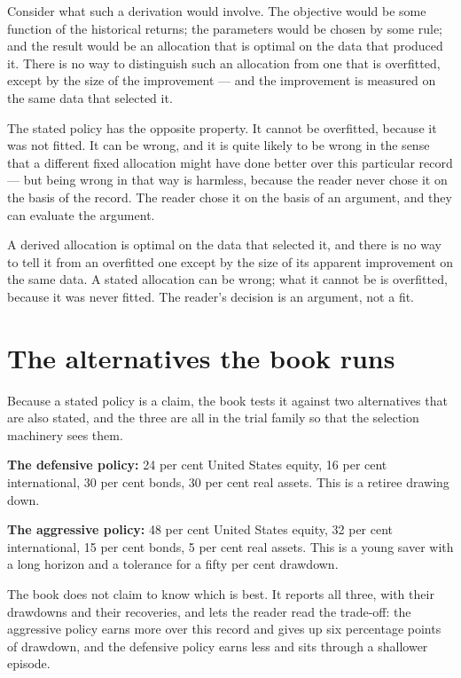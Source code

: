 Consider what such a derivation would involve. The objective would be
some function of the historical returns; the parameters would be chosen
by some rule; and the result would be an allocation that is optimal on
the data that produced it. There is no way to distinguish such an
allocation from one that is overfitted, except by the size of the
improvement --- and the improvement is measured on the same data that
selected it.

The stated policy has the opposite property. It cannot be overfitted,
because it was not fitted. It can be wrong, and it is quite likely to be
wrong in the sense that a different fixed allocation might have done
better over this particular record --- but being wrong in that way is
harmless, because the reader never chose it on the basis of the record.
The reader chose it on the basis of an argument, and they can evaluate the
argument.

\begin{takeaway}
A derived allocation is optimal on the data that selected it, and there is
no way to tell it from an overfitted one except by the size of its
apparent improvement on the same data. A stated allocation can be wrong;
what it cannot be is overfitted, because it was never fitted. The reader's
decision is an argument, not a fit.
\end{takeaway}

\section{The alternatives the book runs}

Because a stated policy is a claim, the book tests it against two
alternatives that are also stated, and the three are all in the trial
family so that the selection machinery sees them.

\textbf{The defensive policy:} 24 per cent United States equity, 16 per
cent international, 30 per cent bonds, 30 per cent real assets. This is a
retiree drawing down.

\textbf{The aggressive policy:} 48 per cent United States equity, 32 per
cent international, 15 per cent bonds, 5 per cent real assets. This is a
young saver with a long horizon and a tolerance for a fifty per cent
drawdown.

The book does not claim to know which is best. It reports all three, with
their drawdowns and their recoveries, and lets the reader read the
trade-off: the aggressive policy earns more over this record and gives up
six percentage points of drawdown, and the defensive policy earns less and
sits through a shallower episode.

